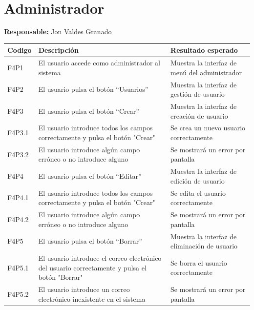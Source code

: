 ﻿\documentclass{report}
\begin{document}
        \section{Administrador}
            \begin{center}
                \textbf{Responsable:} Jon Valdes Granado\\
                \begin{longtable}{|m{2cm}|m{4cm}|m{4cm}|}
                    \hline
                    Codigo & Descripción & Resultado esperado \\
                    \hline
                    \endhead 
                    \hline
                    F4P1 & El usuario accede como administrador al sistema & Muestra la interfaz de menú del administrador  \\
                    \hline
                    F4P2 & El usuario pulsa el botón “Usuarios”  & Muestra la interfaz de gestión de usuario   \\
                    \hline
                    F4P3 & El usuario pulsa el botón “Crear” & Muestra la interfaz de creación de usuario   \\
                    \hline
                    F4P3.1 & El usuario introduce todos los campos correctamente y pulsa el botón "Crear" &  Se crea un nuevo usuario correctamente \\
                    \hline
                    F4P3.2 & El usuario introduce algún campo erróneo o no introduce alguno & Se mostrará un error por pantalla  \\
                    \hline
                    F4P4 & El usuario pulsa el botón “Editar” & Muestra la interfaz de edición de usuario \\
                    \hline
                    F4P4.1 & El usuario introduce todos los campos correctamente y pulsa el botón "Crear" &  Se edita el usuario correctamente  \\
                    \hline
                    F4P4.2 & El usuario introduce algún campo erróneo o no introduce alguno & Se mostrará un error por pantalla   \\
                    \hline  
                    F4P5 & El usuario pulsa el botón “Borrar” & Muestra la interfaz de eliminación de usuario \\ 
                    \hline    
                    F4P5.1 & El usuario introduce el correo electrónico del usuario correctamente y pulsa el botón "Borrar" &  Se borra el usuario correctamente \\ 
                    \hline
                    F4P5.2 & El usuario introduce un correo electrónico inexistente en el sistema & Se mostrará un error por pantalla \\ 
                    \hline 
                \end{longtable}
            \end{center}
            \clearpage
\end{document}

